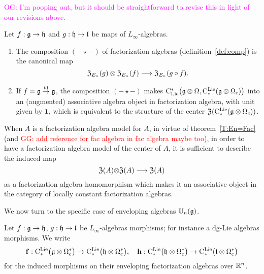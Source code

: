 \documentclass[11pt]{amsart}
\numberwithin{equation}{section}
\def\owen{\textcolor{magenta}{OG: }\textcolor{magenta}}
\def\greg{\textcolor{red}{GG: }\textcolor{red}}
\begin{document}
\owen{I'm pooping out, but it should be straightforward to revise this in light of our revisions above.}

\begin{thm}
\label{T:compcentralizer}
 Let $f: \mathfrak g \to \mathfrak h$ and $g: \mathfrak h \to \mathfrak l$ be maps of  $L_\infty$-algebras.
\begin{enumerate} 
\item The composition $(-\star-)$ of factorization algebras (definition~\ref{def:comp}) is the canonical map 
\[{\frak Z}_{E_n}(g) \otimes {\frak Z}_{E_n}(f) \longrightarrow {\frak Z}_{E_n}(g\circ f).\] 
\item If $f= \mathfrak g \stackrel{{\rm id}}\to \mathfrak g$,  the composition $(-\star-)$ makes 
${\rm C}_{\rm Lie}^*\big(\mathfrak g \otimes \Omega, {\rm C}^{\rm Lie}_*(\mathfrak g \otimes \Omega_c) \big)$ into an 
(augmented) associative algebra object in factorization algebra, with unit given by $\mathbf{1}$, 
which is equivalent to the structure of the center ${\frak Z} ({\rm C}^{\rm Lie}_*(\mathfrak g \otimes \Omega_c))$. 
\end{enumerate}
\end{thm}

When $A$ is a factorization algebra model for $A$, in virtue of theorem~\ref{T:En=Fac} 
(and \greg{add reference for fac algebra in fac algebra maybe too}), in order to have a factorization algebra 
model of the center of $A$, it is sufficient to describe the induced map 
\[{\frak Z}(A){\otimes} {\frak Z}(A) \longrightarrow {\frak Z}(A)\]
as a factorization algebra homomorphism which makes it an associative object in the category of locally constant factorization algebras.



We now turn to the specific case   of enveloping algebras $\mathbb U_n(\mathfrak g)$.

Let $f: \mathfrak g \to \mathfrak h$, $g: \mathfrak h \to \mathfrak l$ be  $L_\infty$-algebras morphisms; for instance a dg-Lie algebras morphisms. We write 
\[ \mathbf{f}:{\rm C}^{\rm Lie}_*\big(\mathfrak g \otimes \Omega^*_c\big) \to  {\rm C}^{\rm Lie}_*\big(\mathfrak h \otimes \Omega^*_c\big), \quad 
\mathbf{h}:{\rm C}^{\rm Lie}_*\big(\mathfrak h \otimes \Omega^*_c\big) \to  {\rm C}^{\rm Lie}_*\big(\mathfrak l \otimes \Omega^*_c\big)\]
for the induced morphisms on their enveloping factorization algebras over $\mathbb R^n$.
\end{document}
